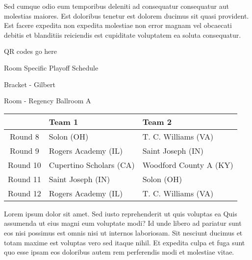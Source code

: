 \documentclass{article}%
\begin{document}
\newline%
Sed cumque odio eum temporibus deleniti ad consequatur consequatur aut molestias maiores. Est doloribus tenetur est dolorem ducimus sit quasi provident. Est facere expedita non expedita molestiae non error magnam vel obcaecati debitis et blanditiis reiciendis est cupiditate voluptatem ea soluta consequatur.%
\vspace*{140pt}%
\begin{center}%
\begin{Huge}%
QR codes go here%
\end{Huge}%
\end{center}%
\newpage%
\begin{center}%
\begin{Huge}%
Room Specific Playoff Schedule%
\end{Huge}%
\vspace*{8pt}%
\linebreak%
\begin{Large}%
Bracket {-} Gilbert%
\end{Large}%
\vspace*{8pt}%
\linebreak%
\vspace*{8pt}%
\begin{Large}%
Room {-} Regency Ballroom A%
\end{Large}%
\end{center}%
%
\begin{tabularx}{\textwidth}{|c|Y|Y|}%
\hline%
&Team 1&Team 2\\%
\hline%
Round 8&Solon (OH)&T. C. Williams (VA)\\%
Round 9&Rogers Academy (IL)&Saint Joseph (IN)\\%
Round 10&Cupertino Scholars (CA)&Woodford County A (KY)\\%
Round 11&Saint Joseph (IN)&Solon (OH)\\%
Round 12&Rogers Academy (IL)&T. C. Williams (VA)\\%
\hline%
\end{tabularx}%
\vspace*{8pt}%
\newline%
Lorem ipsum dolor sit amet. Sed iusto reprehenderit ut quis voluptas ea Quis assumenda ut eius magni eum voluptate modi? Id unde libero ad pariatur sunt eos nisi possimus est omnis nisi ut internos laboriosam. Sit nesciunt ducimus et totam maxime est voluptas vero sed itaque nihil. Et expedita culpa et fuga sunt quo esse ipsam eos doloribus autem rem perferendis modi et molestiae vitae.\newline%
\end{document}
